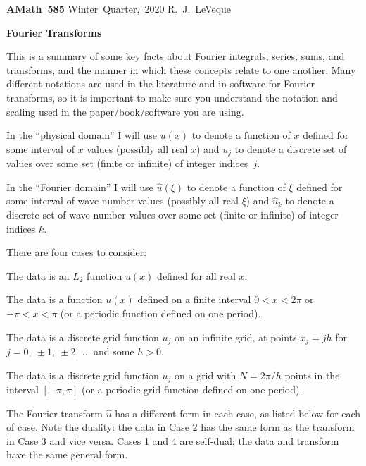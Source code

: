 \documentclass[11pt]{article}
\begin{document}
\hfill\vbox{\hbox{\bf AMath 585}
\hbox{Winter Quarter, 2020}
\hbox{R.\ J.\ LeVeque}}


\vskip 30pt
\centerline{\Large\bf Fourier Transforms}
\vskip 10pt



This is a summary of some key facts about Fourier integrals, series, 
sums, and transforms,
and the manner in which these concepts relate to one another.
Many different notations are used in the literature and in software for
Fourier transforms, so it is important to make sure you understand the
notation and scaling used in the paper/book/software you are using.


\vskip 5pt
In the ``physical domain''
I will use $u(x)$ to denote a function of $x$ defined for some interval
of $x$ values (possibly all real $x$) and $u_j$ to denote a discrete set of
values over some set (finite or infinite) of integer indices~$j$.

In the ``Fourier domain'' 
I will use $\hat u(\xi)$ to denote a function of $\xi$ defined for some interval
of wave number values (possibly all real $\xi$) 
and $\hat u_k$ to denote a discrete set of wave number 
values over some set (finite or infinite) of integer indices $k$.

\vskip 5pt
There are four cases to consider:
\begin{list}{{\bf Case .}}{
             \setlength{\leftmargin}{1.5cm}}
\item The data is an $L_2$ function $u(x)$ defined for all real $x$.
\item The data is a function $u(x)$ defined on a finite interval $0
< x < 2\pi$ or $-\pi < x < \pi$ (or a periodic function defined on one period).
\item The data is a discrete grid function $u_j$ on an infinite grid, at
points $x_j = jh$ for $j=0,~\pm 1,~\pm2,~\ldots$ and some $h>0$.
\item The data is a discrete grid function $u_j$ on a grid with $N= 2\pi / h$
points in the interval $[-\pi,\pi]$ (or a periodic grid function
defined on one period).
\end{list}

The Fourier transform $\hat u$ has a different form in each case, as listed
below for each of case.  Note the duality: the data in Case 2 has the same
form as the transform in Case 3 and vice versa.  Cases 1 and 4 are
self-dual; the data and transform have the same general form.
\end{document}
